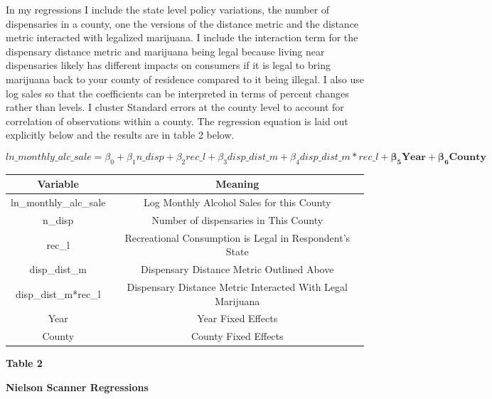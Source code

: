 \documentclass[11pt]{article}
\begin{document}
In my regressions I include the state level policy variations, the number of dispensaries in a county, one the versions of the distance metric and the distance metric interacted with legalized marijuana. I include the interaction term for the dispensary distance metric and marijuana being legal because living near dispensaries likely has different impacts on consumers if it is legal to bring marijuana back to your county of residence compared to it being illegal. I also use log sales so that the coefficients can be interpreted in terms of percent changes rather than levels. I cluster Standard errors at the county level to account for correlation of observations within a county. The regression equation is laid out explicitly below and the results are in table 2 below. 

$$
ln\_monthly\_alc\_sale = \beta_0 +  \beta_1  n\_disp  + \beta_2 rec\_l + \beta_3 disp\_dist\_m + \beta_4 disp\_dist\_m*rec\_l + \bm{\beta_5 Year} + \bm{\beta_6 County}$$

\begin{center}
	\begin{tabular}{||c | c||} 
		\hline
		Variable & Meaning  \\ [0.5ex] 
		\hline\hline
		ln\_monthly\_alc\_sale & Log Monthly Alcohol Sales for this County \\ 
		\hline 
		n\_disp & Number of dispensaries in This County  \\ 
		\hline
		rec\_l & Recreational Consumption is Legal in Respondent's State  \\ 
		\hline
		disp\_dist\_m & Dispensary Distance Metric Outlined Above \\
		\hline
		disp\_dist\_m*rec\_l & Dispensary Distance Metric Interacted With Legal Marijuana\\
		\hline
		Year & Year Fixed Effects \\
		\hline
		County & County Fixed Effects\\[1ex] 
		\hline
	\end{tabular}
\end{center}


\begin{center}
	
	\centering
	\LARGE{\textbf{Table 2}}\par\medskip
	
	\normalsize{\textbf{Nielson Scanner Regressions}}\par\medskip
	\scalebox{.8}{
		
	}
\end{center}
\end{document}
